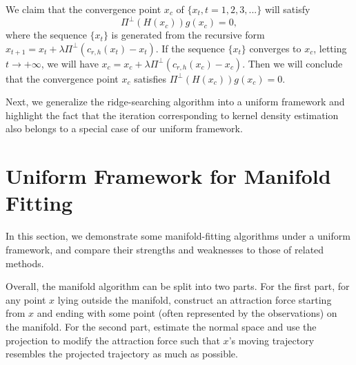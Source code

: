 \documentclass[aos,preprint]{imsart}
\theoremstyle{remark}
\begin{document}
\begin{appendix}
We claim that the convergence point $x_c$ of $\{x_t, t=1,2,3,...\}$ will satisfy 
\[
\Pi^{\perp}(H(x_c)) g(x_c)=0,
\] where the sequence $\{x_t\}$ is generated from the recursive form $x_{t+1} = x_t + \lambda \Pi^\perp (c_{r,h}(x_t) - x_t)$. If the sequence $\{x_t\}$ converges to $x_c$, letting $t \rightarrow +\infty$, we will have $x_c = x_c + \lambda \Pi^\perp (c_{r,h}(x_c) - x_c)$. Then we will conclude that the convergence point $x_c$ satisfies $\Pi^{\perp}(H(x_c)) g(x_c)=0$.



Next, we generalize the ridge-searching algorithm into a uniform framework and highlight the fact that the iteration corresponding to kernel density estimation also belongs to a special case of our uniform framework.

\section{Uniform Framework for Manifold Fitting}

In this section, we demonstrate some manifold-fitting algorithms under a uniform framework, and compare their strengths and weaknesses to those of related methods.

Overall, the manifold algorithm can be split into two parts. For the first part, for any point ${x}$ lying outside the manifold, construct an attraction force starting from ${x}$ and ending with some point (often represented by the observations) on the manifold. For the second part, estimate the normal space and use the projection to modify the attraction force such that $x$'s moving trajectory resembles the projected trajectory as much as possible.



\end{appendix}
\end{document}
